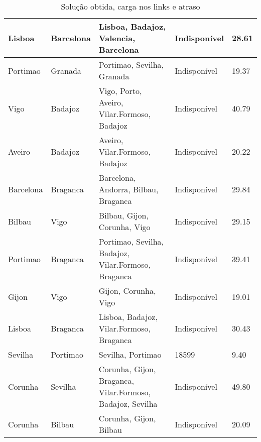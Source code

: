 \begin{table}[!htb]
{\begin{tabular}{|l|l|l|l|l|}
Lisboa & Barcelona & Lisboa, Badajoz, Valencia, Barcelona & Indisponível & 28.61 \\ \hline
Portimao & Granada & Portimao, Sevilha, Granada & Indisponível & 19.37 \\ \hline
Vigo & Badajoz & Vigo, Porto, Aveiro, Vilar.Formoso, Badajoz & Indisponível & 40.79 \\ \hline
Aveiro & Badajoz & Aveiro, Vilar.Formoso, Badajoz & Indisponível & 20.22 \\ \hline
Barcelona & Braganca & Barcelona, Andorra, Bilbau, Braganca & Indisponível & 29.84 \\ \hline
Bilbau & Vigo & Bilbau, Gijon, Corunha, Vigo & Indisponível & 29.15 \\ \hline
Portimao & Braganca & Portimao, Sevilha, Badajoz, Vilar.Formoso, Braganca & Indisponível & 39.41 \\ \hline
Gijon & Vigo & Gijon, Corunha, Vigo & Indisponível & 19.01 \\ \hline
Lisboa & Braganca & Lisboa, Badajoz, Vilar.Formoso, Braganca & Indisponível & 30.43 \\ \hline
Sevilha & Portimao & Sevilha, Portimao & 18599 & 9.40 \\ \hline
Corunha & Sevilha & Corunha, Gijon, Braganca, Vilar.Formoso, Badajoz, Sevilha & Indisponível & 49.80 \\ \hline
Corunha & Bilbau & Corunha, Gijon, Bilbau & Indisponível & 20.09 \\ \hline
\end{tabular}}
\caption[]{Solução obtida, carga nos links e atraso}
\end{table}


